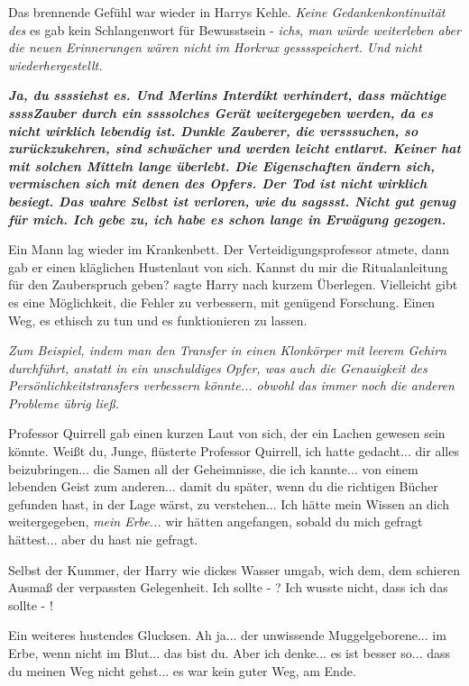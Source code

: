 Das brennende Gefühl war wieder in Harrys Kehle. \glqq{}\emph{Keine
Gedankenkontinuität des} \glqq{} es gab kein Schlangenwort für Bewusstsein \glqq{}
-\emph{ ichs, man würde weiterleben aber die neuen Erinnerungen wären nicht im
Horkrux gesssspeichert. Und nicht wiederhergestellt.}\grqq{}

\glqq{}\textbf{\emph{Ja, du ssssiehst es. Und Merlins Interdikt verhindert, dass
mächtige ssssZauber durch ein ssssolches Gerät weitergegeben werden, da es nicht
wirklich lebendig ist. Dunkle Zauberer, die versssuchen, so zurückzukehren, sind
schwächer und werden leicht entlarvt. Keiner hat mit solchen Mitteln lange
überlebt. Die Eigenschaften ändern sich, vermischen sich mit denen des Opfers.
Der Tod ist nicht wirklich besiegt. Das wahre Selbst ist verloren, wie du
sagssst. Nicht gut genug für mich. Ich gebe zu, ich habe es schon lange in
Erwägung gezogen.}}\grqq{}

Ein Mann lag wieder im Krankenbett. Der Verteidigungsprofessor atmete, dann gab
er einen kläglichen Hustenlaut von sich. \glqq{}Kannst du mir die Ritualanleitung
für den Zauberspruch geben?\grqq{} sagte Harry nach kurzem Überlegen. \glqq{}
Vielleicht gibt es eine Möglichkeit, die Fehler zu verbessern, mit genügend
Forschung. Einen Weg, es ethisch zu tun und es funktionieren zu lassen.\grqq{}

\emph{Zum Beispiel, indem man den Transfer in einen Klonkörper mit leerem Gehirn
durchführt, anstatt in ein unschuldiges Opfer, was auch die Genauigkeit des
Persönlichkeitstransfers verbessern könnte... obwohl das immer noch die anderen
Probleme übrig ließ.}

Professor Quirrell gab einen kurzen Laut von sich, der ein Lachen gewesen sein
könnte. \glqq{}Weißt du, Junge\grqq{}, flüsterte Professor Quirrell, \glqq{}ich
hatte gedacht... dir alles beizubringen... die Samen all der Geheimnisse, die
ich kannte... von einem lebenden Geist zum anderen... damit du später, wenn du
die richtigen Bücher gefunden hast, in der Lage wärst, zu verstehen... Ich hätte
mein Wissen an dich weitergegeben, \emph{mein Erbe...} wir hätten angefangen,
sobald du mich gefragt hättest... aber du hast nie gefragt.\grqq{}

Selbst der Kummer, der Harry wie dickes Wasser umgab, wich dem, dem schieren
Ausmaß der verpassten Gelegenheit. \glqq{}Ich sollte - ? Ich wusste nicht, dass
ich das sollte - !\grqq{}

Ein weiteres hustendes Glucksen. \glqq{}Ah ja... der unwissende Muggelgeborene...
im Erbe, wenn nicht im Blut... das bist du. Aber ich denke... es ist besser
so... dass du meinen Weg nicht gehst... es war kein guter Weg, am Ende.\grqq{}

